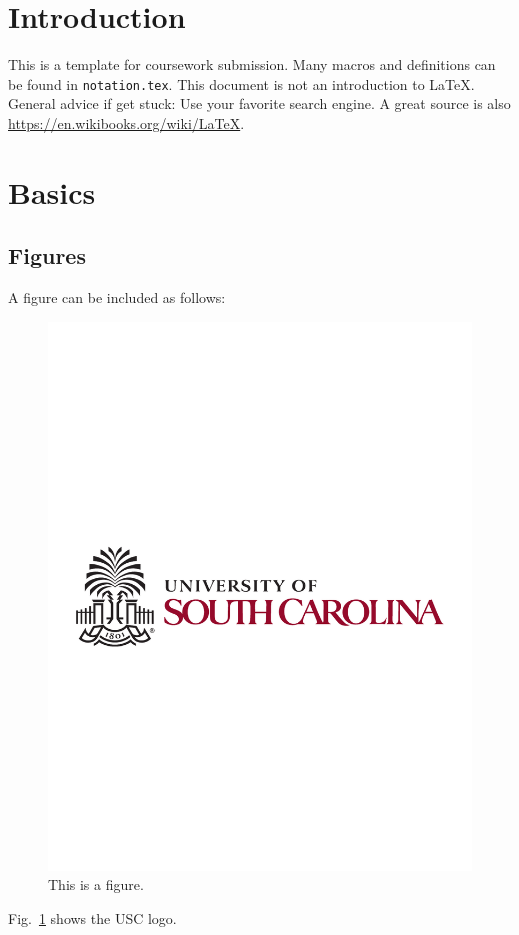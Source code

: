 \documentclass[12pt,twoside]{article}
\begin{document}



\section{Introduction}
This is a template for coursework submission. Many macros and definitions can be found in \texttt{notation.tex}. This document is not an introduction to LaTeX. General advice if get stuck: Use your favorite search engine. A great source is also \mbox{\url{https://en.wikibooks.org/wiki/LaTeX}}.

\section{Basics}

\subsection{Figures}
A figure can be included as follows:
\begin{figure}[tb]
\centering %
\includegraphics[width = 0.7\hsize]{./figures/usc} %
\caption{This is a figure.} %
\label{fig:usc} %
\end{figure}
Fig.~\ref{fig:usc} shows the USC logo. 
\end{document}
